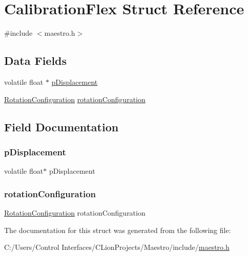 \hypertarget{struct_calibration_flex}{}\section{Calibration\+Flex Struct Reference}
\label{struct_calibration_flex}


{\ttfamily \#include $<$maestro.\+h$>$}

\subsection*{Data Fields}
\begin{DoxyCompactItemize}
\item 
volatile float $\ast$ \hyperlink{struct_calibration_flex_ab518a2152d4db86a5e4558427b521b17}{p\+Displacement}
\item 
\hyperlink{struct_rotation_configuration}{Rotation\+Configuration} \hyperlink{struct_calibration_flex_a9e2edddae0348efcccaf4e8827fbe209}{rotation\+Configuration}
\end{DoxyCompactItemize}


\subsection{Field Documentation}
\mbox{\label{struct_calibration_flex_ab518a2152d4db86a5e4558427b521b17}} 
\subsubsection{\texorpdfstring{p\+Displacement}{pDisplacement}}
{\footnotesize\ttfamily volatile float$\ast$ p\+Displacement}

\mbox{\label{struct_calibration_flex_a9e2edddae0348efcccaf4e8827fbe209}} 
\subsubsection{\texorpdfstring{rotation\+Configuration}{rotationConfiguration}}
{\footnotesize\ttfamily \hyperlink{struct_rotation_configuration}{Rotation\+Configuration} rotation\+Configuration}



The documentation for this struct was generated from the following file\+:\begin{DoxyCompactItemize}
\item 
C\+:/\+Users/\+Control Interfaces/\+C\+Lion\+Projects/\+Maestro/include/\hyperlink{maestro_8h}{maestro.\+h}\end{DoxyCompactItemize}
